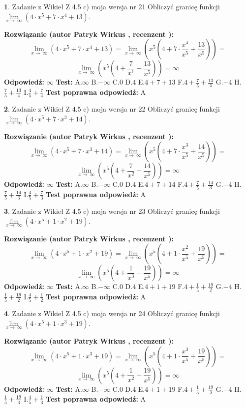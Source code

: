 \documentclass[12pt, a4paper]{article}
\theoremstyle{definition} %
\newtheorem{zad}{}
\newcommand{\zadStart}[1]{\begin{zad}#1\newline}
\newcommand{\zadStop}{\end{zad}}
\newcommand{\rozwStart}[2]{\noindent \textbf{Rozwiązanie (autor #1 , recenzent #2): }\newline}
\newcommand{\rozwStop}{\newline}
\newcommand{\odpStart}{\noindent \textbf{Odpowiedź:}\newline}
\newcommand{\odpStop}{\newline}
\newcommand{\testStart}{\noindent \textbf{Test:}\newline}
\newcommand{\testStop}{\newline}
\newcommand{\kluczStart}{\noindent \textbf{Test poprawna odpowiedź:}\newline}
\newcommand{\kluczStop}{\newline}
\begin{document}
\zadStart{Zadanie z Wikieł Z 4.5 c) moja wersja nr 21}
Obliczyć granicę funkcji  $\lim\limits_{x\to\ \infty}(4 \cdot x^{5}+7 \cdot x^{4}+13)$.
\zadStop
\rozwStart{Patryk Wirkus}{}
$$\lim\limits_{x\to\ \infty}(4 \cdot x^{5}+7 \cdot x^{4}+13) = \lim\limits_{x\to\ \infty}(x^{5}(4 +7 \cdot \frac{x^{4}}{x^{5}}+\frac{13}{x^{5}})) =$$ $$\lim\limits_{x\to\ \infty}(x^{5}(4 +\frac{7}{x^{1}}+\frac{13}{x^{5}})) =\infty$$
\rozwStop
\odpStart
$\infty$
\odpStop
\testStart
A.$\infty$ B.$-\infty$ C.$0$ D.$4$ E.$4 + 7 + 13$
F.$4+\frac{7}{5}+\frac{13}{4}$ G.$-4$
H.$\frac{7}{5}+\frac{13}{4}$
I.$\frac{4}{5}+\frac{7}{4}$
\testStop
\kluczStart
A
\kluczStop



\zadStart{Zadanie z Wikieł Z 4.5 c) moja wersja nr 22}
Obliczyć granicę funkcji  $\lim\limits_{x\to\ \infty}(4 \cdot x^{5}+7 \cdot x^{3}+14)$.
\zadStop
\rozwStart{Patryk Wirkus}{}
$$\lim\limits_{x\to\ \infty}(4 \cdot x^{5}+7 \cdot x^{3}+14) = \lim\limits_{x\to\ \infty}(x^{5}(4 +7 \cdot \frac{x^{3}}{x^{5}}+\frac{14}{x^{5}})) =$$ $$\lim\limits_{x\to\ \infty}(x^{5}(4 +\frac{7}{x^{2}}+\frac{14}{x^{5}})) =\infty$$
\rozwStop
\odpStart
$\infty$
\odpStop
\testStart
A.$\infty$ B.$-\infty$ C.$0$ D.$4$ E.$4 + 7 + 14$
F.$4+\frac{7}{5}+\frac{14}{3}$ G.$-4$
H.$\frac{7}{5}+\frac{14}{3}$
I.$\frac{4}{5}+\frac{7}{3}$
\testStop
\kluczStart
A
\kluczStop



\zadStart{Zadanie z Wikieł Z 4.5 c) moja wersja nr 23}
Obliczyć granicę funkcji  $\lim\limits_{x\to\ \infty}(4 \cdot x^{5}+1 \cdot x^{2}+19)$.
\zadStop
\rozwStart{Patryk Wirkus}{}
$$\lim\limits_{x\to\ \infty}(4 \cdot x^{5}+1 \cdot x^{2}+19) = \lim\limits_{x\to\ \infty}(x^{5}(4 +1 \cdot \frac{x^{2}}{x^{5}}+\frac{19}{x^{5}})) =$$ $$\lim\limits_{x\to\ \infty}(x^{5}(4 +\frac{1}{x^{3}}+\frac{19}{x^{5}})) =\infty$$
\rozwStop
\odpStart
$\infty$
\odpStop
\testStart
A.$\infty$ B.$-\infty$ C.$0$ D.$4$ E.$4 + 1 + 19$
F.$4+\frac{1}{5}+\frac{19}{2}$ G.$-4$
H.$\frac{1}{5}+\frac{19}{2}$
I.$\frac{4}{5}+\frac{1}{2}$
\testStop
\kluczStart
A
\kluczStop



\zadStart{Zadanie z Wikieł Z 4.5 c) moja wersja nr 24}
Obliczyć granicę funkcji  $\lim\limits_{x\to\ \infty}(4 \cdot x^{5}+1 \cdot x^{3}+19)$.
\zadStop
\rozwStart{Patryk Wirkus}{}
$$\lim\limits_{x\to\ \infty}(4 \cdot x^{5}+1 \cdot x^{3}+19) = \lim\limits_{x\to\ \infty}(x^{5}(4 +1 \cdot \frac{x^{3}}{x^{5}}+\frac{19}{x^{5}})) =$$ $$\lim\limits_{x\to\ \infty}(x^{5}(4 +\frac{1}{x^{2}}+\frac{19}{x^{5}})) =\infty$$
\rozwStop
\odpStart
$\infty$
\odpStop
\testStart
A.$\infty$ B.$-\infty$ C.$0$ D.$4$ E.$4 + 1 + 19$
F.$4+\frac{1}{5}+\frac{19}{3}$ G.$-4$
H.$\frac{1}{5}+\frac{19}{3}$
I.$\frac{4}{5}+\frac{1}{3}$
\testStop
\kluczStart
A
\kluczStop
\end{document}
